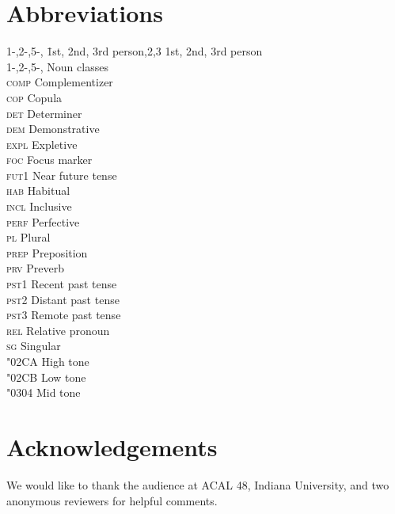 \documentclass[output=paper,
modfonts
]{langscibook}
\begin{document}
\section*{Abbreviations}
\begin{multicols}{2}
\begin{tabbing}
1-,2-,5-,\hspace{1cm} \= 1st, 2nd, 3rd person,2,3          \> 1st, 2nd, 3rd person\\
1-,2-,5-,      \> Noun classes        \\
\textsc{comp}  \> Complementizer      \\
\textsc{cop}   \> Copula              \\
\textsc{det}   \> Determiner          \\
\textsc{dem}   \> Demonstrative       \\
\textsc{expl}  \> Expletive           \\
\textsc{foc}   \> Focus marker        \\
\textsc{fut1}  \> Near future tense   \\
\textsc{hab}   \> Habitual            \\
\textsc{incl}  \> Inclusive           \\
\textsc{perf}  \> Perfective          \\
\textsc{pl}  \> Plural   \\ 
\textsc{prep}  \> Preposition     \\
\textsc{prv}  \> Preverb   \\
\textsc{pst1}  \> Recent past tense \\
\textsc{pst2}  \> Distant past tense  \\
\textsc{pst3}  \> Remote past tense  \\
\textsc{rel}  \> Relative pronoun\\
\textsc{sg}  \> Singular  \\
\char"02CA \> High tone \\
\char"02CB \> Low tone \\
\hspace{1ex}\char"0304\> Mid tone
\end{tabbing}
\end{multicols}


\section*{Acknowledgements}
We would like to thank the audience at ACAL 48, Indiana University, and two anonymous reviewers for helpful comments.

\printbibliography[heading=subbibliography,notkeyword=this]
\end{document}
